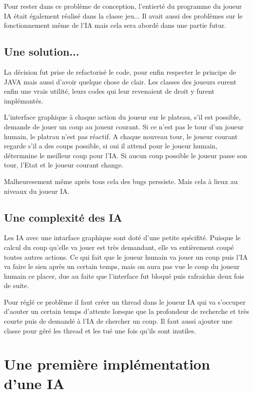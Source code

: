 \documentclass[12pt, legalpaper]{article}
\begin{document}
Pour rester dans ce problème de conception, l'entierté du programme du joueur IA
était également réalisé dans la classe jeu...
Il avait aussi des problèmes sur le fonctionnement même de l'IA mais cela sera abordé
dans une partie futur.

\subsection{Une solution...}
La décision fut prise de refactorisé le code, pour enfin respecter le principe de JAVA
mais aussi d'avoir quelque chose de clair. 
Les classes des joueurs eurent enfin une vrais utilité, leurs codes qui leur revenaient
de droit y furent implémantés.

L'interface graphique à chaque action du joueur sur le plateau, s'il est possible,
demande de jouer un coup au joueur courant.
Si ce n'est pas le tour d'un joueur humain, le platrau n'est pas réactif.
A chaque nouveau tour, le joueur courant regarde s'il a des coups possible, si oui il
attend pour le joueur humain, détermnine le meilleur coup pour l'IA. Si aucun coup
possible le joueur passe son tour, l'Etat et le joueur courant change.
\\\par
Malheuresement même après tous cela des bugs perssiste. Mais cela à lieux au niveaux du
joueur IA.

\subsection{Une complexité des IA}
Les IA avec une intarface graphique sont doté d'une petite spécifité. Puisque le calcul
du coup qu'elle va jouer est très demandant, elle va entièrement coupé toutes autres 
actions. Ce qui fait que le joueur humain va jouer un coup puis l'IA va faire le sien
après un certain temps, mais on aura pas vue le coup du joueur humain ce placer, due
au faite que l'interface fut bloqué puis rafraichis deux fois de suite.

Pour réglé ce problème il faut créer un thread dans le joueur IA qui va s'occuper
d'aouter un certain temps d'attente lorsque que la profondeur de recherche et très courte
puis de demandé à l'IA de chercher un coup. Il faut aussi ajouter une classe pour 
géré les thread et les tué une fois qu'ils sont inutiles.

\newpage

\section{Une première implémentation d'une IA}
\end{document}
